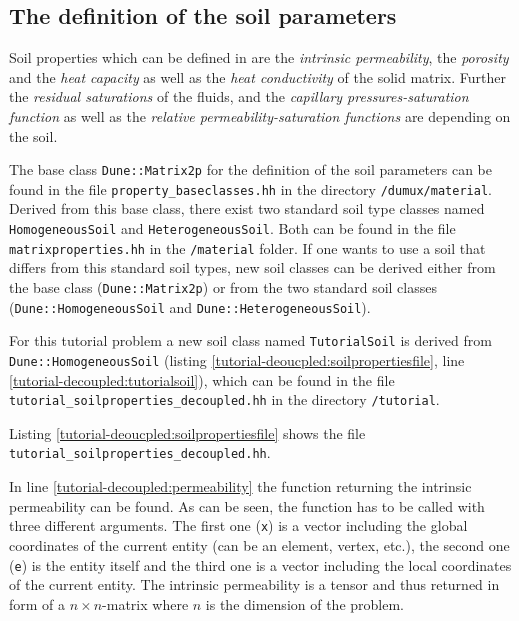 \subsection{The definition of the soil parameters}\label{tutorial-decoupled:description-soil-class}

Soil properties which can be defined in \Dumux are the \textit{intrinsic permeability}, the \textit{porosity} and the \textit{heat capacity} as well as the \textit{heat conductivity} of the solid matrix. Further the \textit{residual saturations} of the fluids, and the \textit{capillary pressures-saturation function} as well as the \textit{relative permeability-saturation functions} are depending on the soil.

The base class \texttt{Dune::Matrix2p} for the definition of the soil parameters can be found in the file \texttt{property\_baseclasses.hh} in the directory \texttt{/dumux/material}. Derived from this base class, there exist two standard soil type classes named \texttt{HomogeneousSoil} and \texttt{HeterogeneousSoil}. Both can be found in the file \texttt{matrixproperties.hh} in the \texttt{/material} folder. If one wants to use a soil that differs from this standard soil types, new soil classes can be derived either from the base class (\texttt{Dune::Matrix2p}) or from the two standard soil classes (\texttt{Dune::HomogeneousSoil} and \texttt{Dune::HeterogeneousSoil}).

For this tutorial problem a new soil class named \texttt{TutorialSoil} is derived from \texttt{Dune::HomogeneousSoil} (listing \ref{tutorial-deoucpled:soilpropertiesfile}, line \ref{tutorial-decoupled:tutorialsoil}), which can be found in the file \texttt{tutorial\_soilproperties\_decoupled.hh} in the directory \texttt{/tutorial}.

Listing \ref{tutorial-deoucpled:soilpropertiesfile} shows the file \texttt{tutorial\_soilproperties\_decoupled.hh}.

\begin{lst}\label{tutorial-deoucpled:soilpropertiesfile} \mbox{}

\end{lst}

In line \ref{tutorial-decoupled:permeability} the function returning the intrinsic permeability can be found. As can be seen, the function has to be called with three different arguments. The first one (\texttt{x}) is a vector including the global coordinates of the current entity (can be an element, vertex, etc.), the second one (\texttt{e}) is the entity itself and the third one is a vector including the local coordinates of the current entity. The intrinsic permeability is a tensor and thus returned in form of a $n \times n$-matrix where $n$ is the dimension of the problem.

